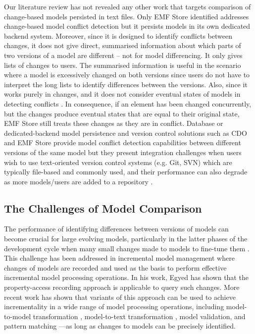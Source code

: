 Our literature review has not revealed any other work that targets comparison of change-based models persisted in text files. Only EMF Store \cite{koegel2010emfstore} identified addresses change-based model conflict detection but it persists models in its own dedicated backend system. Moreover, since it is designed to identify conflicts between changes, it does not give direct, summarised information about which parts of two versions of a model are different -- not for model differencing. It only gives lists of changes to users. The summarised information is useful in the scenario where a model is excessively changed on both versions since users do not have to interpret the long lists to identify differences between the versions. Also, since it works purely in changes, and it does not consider eventual states of models in detecting conflicts \cite{DBLP:conf/sfm/BroschKLSWW12}. In consequence, if an element has been changed concurrently, but the changes produce eventual states that are equal to their original state, EMF Store still treats these changes as they are in conflict. Database or dedicated-backend model persistence and version control solutions such as CDO \cite{eclipse2019cdo} and EMF Store provide model conflict detection capabilities between different versions of the same model but they present integration challenges when users wish to use text-oriented version control systems (e.g. Git, SVN) which are typically file-based and commonly used, and their performance can also degrade as more models/users are added to a repository \cite{KolovosRMPGCLRV13}. 


\subsection{The Challenges of Model Comparison}
\label{sec:the_key_challenge_of_incrementality}

The performance of identifying differences between versions of models can become crucial for large evolving models, particularly in the latter phases of the development cycle when many small changes made to models to fine-tune them \cite{selic2003pragmatics}. This challenge has been addressed in incremental model management where changes of models are recorded and used as the basis to perform effective incremental model processing operations. In his work, Egyed \cite{egyed2011automatically} has shown that the property-access recording approach is applicable to query such changes. More recent work has shown that variants of this approach can be used to achieve incrementality in a wide range of model processing operations, including model-to-model transformation \cite{jouault2010towards}, model-to-text transformation \cite{DBLP:conf/ecmdafa/OgunyomiRK15}, model validation, and pattern matching \cite{DBLP:conf/ecmdafa/RathHV12}---as long as changes to models can be precisely identified.  

